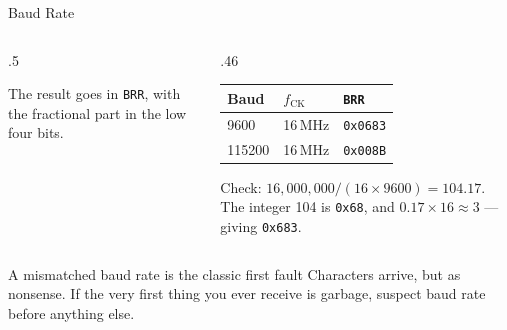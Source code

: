 \documentclass[9pt,aspectratio=169,xcolor=table]{beamer}
\begin{document}
\begin{frame}{Baud Rate}
	\begin{columns}[c]
		\begin{column}{.5\textwidth}
			\begin{center}
			\end{center}

			\vspace{3mm}
			{\small The result goes in \texttt{BRR}, with the fractional part in the
				low four bits.}
		\end{column}
		\begin{column}{.46\textwidth}
			{\small
				\striped
				\begin{tabular}{@{}l l l@{}}
					\toprule
					\textbf{Baud} & \textbf{$f_{\text{CK}}$} & \textbf{\texttt{BRR}} \\
					\midrule
					9600   & 16\,MHz & \texttt{0x0683} \\
					115200 & 16\,MHz & \texttt{0x008B} \\
					\bottomrule
			\end{tabular}}

			\vspace{3mm}
			{\small Check: $16{,}000{,}000 / (16 \times 9600) = 104.17$. The integer
				104 is \texttt{0x68}, and $0.17 \times 16 \approx 3$ --- giving
				\alert{\texttt{0x683}}.}
		\end{column}
	\end{columns}

	\vspace{3mm}
	\begin{block}{A mismatched baud rate is the classic first fault}
		Characters arrive, but as nonsense. If the very first thing you ever
		receive is garbage, suspect \alert{baud rate} before anything else.
	\end{block}
\end{frame}
\end{document}
